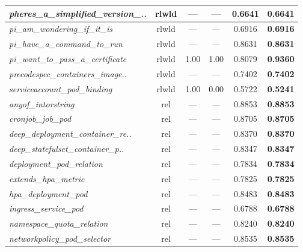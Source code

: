 \begin{footnotesize}
\begin{longtable}{|p{3.6cm}|c|c|c|c|c|}
\hline
\textit{pheres\_\allowbreak{}a\_\allowbreak{}simplified\_\allowbreak{}version\_\allowbreak{}..} & rlwld & --- & --- & 0.6641 & \textbf{0.6641} \\
\hline
\textit{pi\_\allowbreak{}am\_\allowbreak{}wondering\_\allowbreak{}if\_\allowbreak{}it\_\allowbreak{}is} & rlwld & --- & --- & 0.6916 & \textbf{0.6916} \\
\hline
\textit{pi\_\allowbreak{}have\_\allowbreak{}a\_\allowbreak{}command\_\allowbreak{}to\_\allowbreak{}run} & rlwld & --- & --- & 0.8631 & \textbf{0.8631} \\
\hline
\textit{pi\_\allowbreak{}want\_\allowbreak{}to\_\allowbreak{}pass\_\allowbreak{}a\_\allowbreak{}certificate} & rlwld & 1.00 & 1.00 & 0.8079 & \textbf{0.9360} \\
\hline
\textit{precodespec\_\allowbreak{}containers\_\allowbreak{}image..} & rlwld & --- & --- & 0.7402 & \textbf{0.7402} \\
\hline
\textit{serviceaccount\_\allowbreak{}pod\_\allowbreak{}binding} & rlwld & 1.00 & 0.00 & 0.5722 & \textbf{0.5241} \\
\hline
\textit{anyof\_\allowbreak{}intorstring} & rel & --- & --- & 0.8853 & \textbf{0.8853} \\
\hline
\textit{cronjob\_\allowbreak{}job\_\allowbreak{}pod} & rel & --- & --- & 0.8705 & \textbf{0.8705} \\
\hline
\textit{deep\_\allowbreak{}deployment\_\allowbreak{}container\_\allowbreak{}re..} & rel & --- & --- & 0.8370 & \textbf{0.8370} \\
\hline
\textit{deep\_\allowbreak{}statefulset\_\allowbreak{}container\_\allowbreak{}p..} & rel & --- & --- & 0.8347 & \textbf{0.8347} \\
\hline
\textit{deployment\_\allowbreak{}pod\_\allowbreak{}relation} & rel & --- & --- & 0.7834 & \textbf{0.7834} \\
\hline
\textit{extends\_\allowbreak{}hpa\_\allowbreak{}metric} & rel & --- & --- & 0.7825 & \textbf{0.7825} \\
\hline
\textit{hpa\_\allowbreak{}deployment\_\allowbreak{}pod} & rel & --- & --- & 0.8483 & \textbf{0.8483} \\
\hline
\textit{ingress\_\allowbreak{}service\_\allowbreak{}pod} & rel & --- & --- & 0.6788 & \textbf{0.6788} \\
\hline
\textit{namespace\_\allowbreak{}quota\_\allowbreak{}relation} & rel & --- & --- & 0.8240 & \textbf{0.8240} \\
\hline
\textit{networkpolicy\_\allowbreak{}pod\_\allowbreak{}selector} & rel & --- & --- & 0.8535 & \textbf{0.8535} \\

\end{longtable}
\end{footnotesize}
